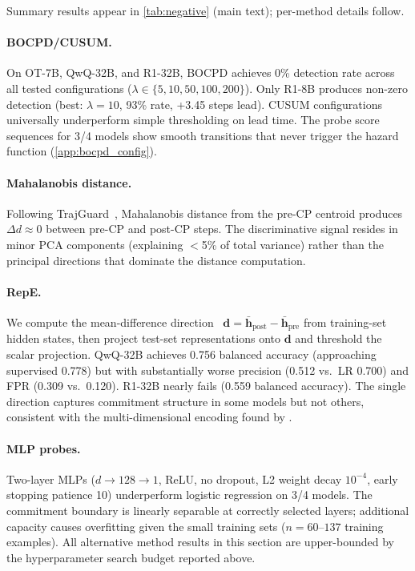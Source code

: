 Summary results appear in \cref{tab:negative} (main text); per-method details follow.

\paragraph{BOCPD/CUSUM.} On OT-7B, QwQ-32B, and R1-32B, BOCPD achieves 0\% detection rate across all tested configurations ($\lambda \in \{5, 10, 50, 100, 200\}$). Only R1-8B produces non-zero detection (best: $\lambda{=}10$, 93\% rate, +3.45 steps lead). CUSUM configurations universally underperform simple thresholding on lead time. The probe score sequences for 3/4 models show smooth transitions that never trigger the hazard function (\cref{app:bocpd_config}).

\paragraph{Mahalanobis distance.} Following TrajGuard~\cite{trajguard}, Mahalanobis distance from the pre-CP centroid produces $\Delta d \approx 0$ between pre-CP and post-CP steps. The discriminative signal resides in minor PCA components (explaining $<$5\% of total variance) rather than the principal directions that dominate the distance computation.

\paragraph{RepE.} We compute the mean-difference direction~\cite{zou2023representation} $\mathbf{d} = \bar{\mathbf{h}}_{\text{post}} - \bar{\mathbf{h}}_{\text{pre}}$ from training-set hidden states, then project test-set representations onto $\mathbf{d}$ and threshold the scalar projection. QwQ-32B achieves 0.756 balanced accuracy (approaching supervised 0.778) but with substantially worse precision (0.512 vs.\ LR 0.700) and FPR (0.309 vs.\ 0.120). R1-32B nearly fails (0.559 balanced accuracy). The single direction captures commitment structure in some models but not others, consistent with the multi-dimensional encoding found by \citet{wollschlager2025geometry}.

\paragraph{MLP probes.} Two-layer MLPs ($d \rightarrow 128 \rightarrow 1$, ReLU, no dropout, L2 weight decay $10^{-4}$, early stopping patience 10) underperform logistic regression on 3/4 models. The commitment boundary is linearly separable at correctly selected layers; additional capacity causes overfitting given the small training sets ($n{=}60$--$137$ training examples). All alternative method results in this section are upper-bounded by the hyperparameter search budget reported above.


